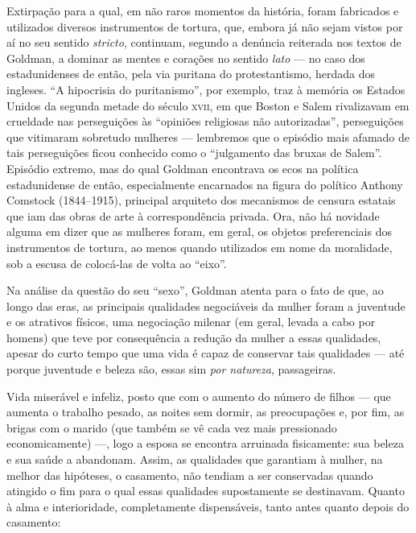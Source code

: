 Extirpação para a qual, em não raros momentos da
história, foram fabricados e utilizados diversos instrumentos de
tortura, que, embora já não sejam vistos por aí no seu
sentido \emph{stricto}, continuam, segundo a denúncia reiterada nos
textos de Goldman, a dominar as mentes e corações no sentido
\emph{lato} --- no caso dos estadunidenses de então, pela via puritana do
protestantismo, herdada dos ingleses. ``A
hipocrisia do puritanismo'', por exemplo, traz à memória os Estados Unidos da
segunda metade do século \textsc{xvii}, em que Boston e Salem rivalizavam em
crueldade nas perseguições às ``opiniões religiosas não autorizadas'',
perseguições que vitimaram sobretudo mulheres --- lembremos que o
episódio mais afamado de tais perseguições ficou conhecido como o
``julgamento das bruxas de Salem''.
Episódio extremo, mas do qual Goldman encontrava os ecos na política
estadunidense de então, especialmente encarnados na figura do político
Anthony Comstock (1844--1915), principal arquiteto dos mecanismos de
censura estatais que iam das obras de arte à correspondência privada.
Ora, não há novidade alguma em dizer que as mulheres foram, em geral, os
objetos preferenciais dos instrumentos de tortura, ao menos quando
utilizados em nome da moralidade, sob a escusa de colocá-las de volta ao
``eixo''.

Na análise da questão do seu ``sexo'', Goldman
atenta para o fato de que, ao longo das eras, as principais qualidades
negociáveis da mulher foram a juventude e os atrativos físicos, uma
negociação milenar (em geral, levada a cabo por homens) que teve por
consequência a redução da mulher a essas qualidades, apesar do curto
tempo que uma vida é capaz de
conservar tais qualidades --- até porque juventude e beleza são, essas sim \emph{por natureza}, passageiras.

Vida miserável e infeliz, posto que com o aumento do número
de filhos --- que aumenta o trabalho pesado, as noites sem
dormir, as preocupações e, por fim, as brigas com o marido (que também
se vê cada vez mais pressionado economicamente) ---, logo a
esposa se encontra arruinada fisicamente: sua beleza e sua saúde a
abandonam. Assim, as qualidades que garantiam à mulher, na
melhor das hipóteses, o casamento, não tendiam a ser conservadas quando
atingido o fim para o qual essas qualidades supostamente se destinavam.
Quanto à alma e interioridade, completamente dispensáveis,
tanto antes quanto depois do casamento:

